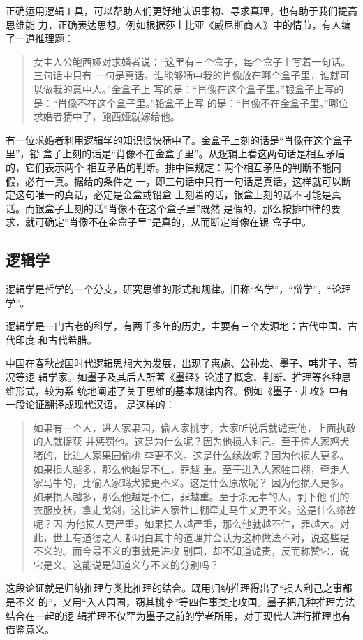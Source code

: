 \documentclass[final,oneside]{ctexbook}
\newenvironment{equotation}{\begin{quotation}\kaishu}{\end{quotation}}
\begin{document}
正确运用逻辑工具，可以帮助人们更好地认识事物、寻求真理，也有助于我们提高思维能
力，正确表达思想。例如根据莎士比亚《威尼斯商人》中的情节，有人编了一道推理题：
\begin{equotation}
  女主人公鲍西娅对求婚者说：“这里有三个盒子，每个盒子上写着一句话。三句话中只有
  一句是真话。谁能够猜中我的肖像放在哪个盒子里，谁就可以做我的意中人。”金盒子上
  写的是：“肖像在这个盒子里。”银盒子上写的是：“肖像不在这个盒子里。”铅盒子上写
  的是：“肖像不在金盒子里。”哪位求婚者猜中了，鲍西娅就嫁给他。
\end{equotation}
有一位求婚者利用逻辑学的知识很快猜中了。金盒子上刻的话是“肖像在这个盒子里”，铅
盒子上刻的话是“肖像不在金盒子里”。从逻辑上看这两句话是相互矛盾的，它们表示两个
相互矛盾的判断。排中律规定：两个相互矛盾的判断不能同假，必有一真。据给的条件之
一，即三句话中只有一句话是真话，这样就可以断定这句唯一的真话，必定是金盒或铅盒
上刻着的话，银盒上刻的话不可能是真话。而银盒子上刻的话“肖像不在这个盒子里”既然
是假的，那么按排中律的要求，就可确定“肖像不在金盒子里”是真的，从而断定肖像在银
盒子中。

\subsection{逻辑学}

   
逻辑学是哲学的一个分支，研究思维的形式和规律。旧称“名学”，“辩学”，“论理学”。

逻辑学是一门古老的科学，有两千多年的历史，主要有三个发源地：古代中国、古代印度
和古代希腊。

中国在春秋战国时代逻辑思想大为发展，出现了惠施、公孙龙、墨子、韩非子、荀况等逻
辑学家。如墨子及其后人所著《墨经》论述了概念、判断、推理等各种思维形式，较为系
统地阐述了关于思维的基本规律内容。例如《墨子·非攻》中有一段论证翻译成现代汉语，
是这样的：
\begin{equotation}
  如果有一个人，进人家果园，偷人家桃李，大家听说后就谴责他，上面执政的人就捉获
  并惩罚他。这是为什么呢？因为他损人利己。至于偷人家鸡犬猪的，比进人家果园偷桃
  李更不义。这是什么缘故呢？因为他损人更多。如果损人越多，那么他越是不仁，罪越
  重。至于进入人家牲口棚，牵走人家马牛的，比偷人家鸡犬猪更不义。这是什么原故呢？
  因为他损人更多。如果损人越多，那么他越是不仁，罪越重。至于杀无辜的人，剥下他
  们的衣服皮袄，拿走戈剑，这比进人家牲口棚牵走马牛又更不义。这是什么缘故呢？因
  为他损人更严重。如果损人越严重，那么他就越不仁，罪越大。对此，世上有道德之人
  都明白其中的道理并会认为这种做法不对，说这些是不义的。而今最不义的事就是进攻
  别国，却不知道谴责，反而称赞它，说它是义。这能说是知道义与不义的分别吗？
\end{equotation}
这段论证就是归纳推理与类比推理的结合。既用归纳推理得出了“损人利己之事都是不义
的”，又用“入人园圃，窃其桃李”等四件事类比攻国。墨子把几种推理方法结合在一起的逻
辑推理不仅罕为墨子之前的学者所用，对于现代人进行推理也有借鉴意义。
\end{document}
